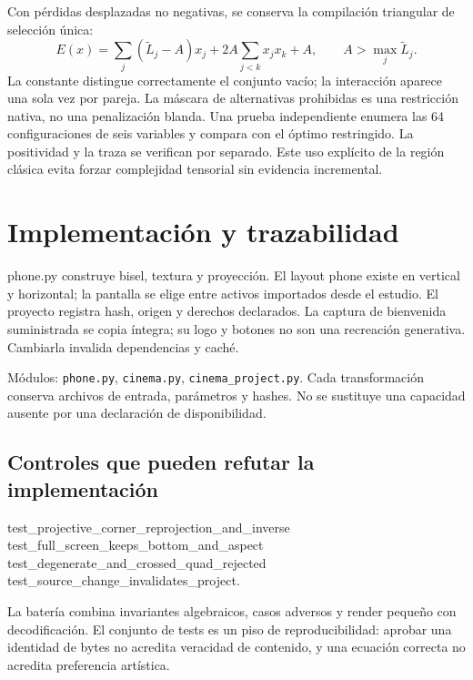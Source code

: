 \documentclass[10pt,a4paper]{article}
\begin{document}
Con pérdidas desplazadas no negativas, se conserva la compilación triangular de selección única:
\begin{equation}
E(x)=\sum_j(\widetilde L_j-A)x_j+2A\sum_{j<k}x_jx_k+A,\qquad A>\max_j\widetilde L_j.
\end{equation}
La constante distingue correctamente el conjunto vacío; la interacción aparece una sola vez por pareja. La máscara de alternativas prohibidas es una restricción nativa, no una penalización blanda. Una prueba independiente enumera las 64 configuraciones de seis variables y compara con el óptimo restringido. La positividad y la traza se verifican por separado. Este uso explícito de la región clásica evita forzar complejidad tensorial sin evidencia incremental.
\section{Implementación y trazabilidad}
phone.py construye bisel, textura y proyección. El layout phone existe en vertical y horizontal; la pantalla se elige entre activos importados desde el estudio. El proyecto registra hash, origen y derechos declarados. La captura de bienvenida suministrada se copia íntegra; su logo y botones no son una recreación generativa. Cambiarla invalida dependencias y caché.

Módulos: \texttt{phone.py}, \texttt{cinema.py}, \texttt{cinema\_\allowbreak{}project.py}. Cada transformación conserva archivos de entrada, parámetros y hashes. No se sustituye una capacidad ausente por una declaración de disponibilidad.
\subsection{Controles que pueden refutar la implementación}
\begin{flushleft}\small test\_\allowbreak{}projective\_\allowbreak{}corner\_\allowbreak{}reprojection\_\allowbreak{}and\_\allowbreak{}inverse\\ test\_\allowbreak{}full\_\allowbreak{}screen\_\allowbreak{}keeps\_\allowbreak{}bottom\_\allowbreak{}and\_\allowbreak{}aspect\\ test\_\allowbreak{}degenerate\_\allowbreak{}and\_\allowbreak{}crossed\_\allowbreak{}quad\_\allowbreak{}rejected\\ test\_\allowbreak{}source\_\allowbreak{}change\_\allowbreak{}invalidates\_\allowbreak{}project.\end{flushleft}

La batería combina invariantes algebraicos, casos adversos y render pequeño con decodificación. El conjunto de tests es un piso de reproducibilidad: aprobar una identidad de bytes no acredita veracidad de contenido, y una ecuación correcta no acredita preferencia artística.
\end{document}
